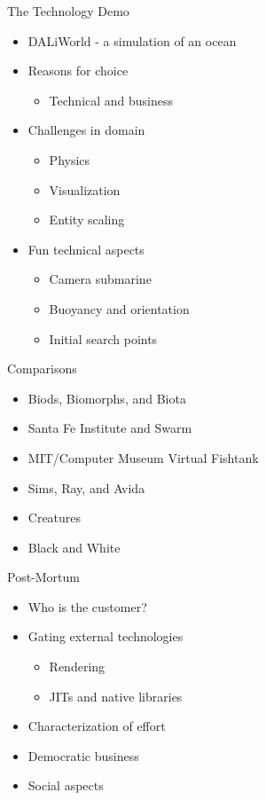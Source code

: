 \documentclass[%
final,
slideColor,
nototal,
nocolorBG,
pdf,
accumulate,
next,
]{prosper}
\begin{document}
\begin{slide}{The Technology Demo}
  \begin{itemize}
  \item DALiWorld - a simulation of an ocean
  \item Reasons for choice
    \begin{itemize}
    \item Technical and business
    \end{itemize}
  \item Challenges in domain
    \begin{itemize}
    \item Physics
    \item Visualization
    \item Entity scaling
    \end{itemize}
  \item Fun technical aspects
    \begin{itemize}
    \item Camera submarine
    \item Buoyancy and orientation
    \item Initial search points
    \end{itemize}
  \end{itemize}
\end{slide}

\begin{slide}{Comparisons}
  \begin{itemize}
  \item Biods, Biomorphs, and Biota
  \item Santa Fe Institute and Swarm
  \item MIT/Computer Museum Virtual Fishtank
  \item Sims, Ray, and Avida
  \item Creatures
  \item Black and White
  \end{itemize}
\end{slide}

\begin{slide}{Post-Mortum}
  \begin{itemize}
  \item Who is the customer?
  \item Gating external technologies
    \begin{itemize}
    \item Rendering
    \item JITs and native libraries
    \end{itemize}
  \item Characterization of effort
  \item Democratic business
  \item Social aspects
  \end{itemize}
\end{slide}
\end{document}
